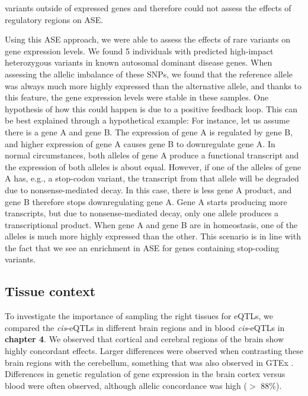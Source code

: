 variants outside of expressed genes and therefore could not assess the effects of regulatory regions on ASE.


Using this ASE approach, we were able to assess the effects of rare variants on gene expression levels. We found 5 individuals with predicted high-impact heterozygous variants in known autosomal dominant disease genes. When assessing the allelic imbalance of these SNPs, we found that the reference allele was always much more highly expressed than the alternative allele, and thanks to this feature, the gene expression levels were stable in these samples. One hypothesis of how this could happen is due to a positive feedback loop. This can be best explained through a hypothetical example: For instance, let us assume there is a gene A and gene B. The expression of gene A is regulated by gene B, and higher expression of gene A causes gene B to downregulate gene A. In normal circumstances, both alleles of gene A produce a functional transcript and the expression of both alleles is about equal. However, if one of the alleles of gene A has, e.g., a stop-codon variant, the transcript from that allele will be degraded due to nonsense-mediated decay. In this case, there is less gene A product, and gene B therefore stops downregulating gene A. Gene A starts producing more transcripts, but due to nonsense-mediated decay, only one allele produces a transcriptional product. When gene A and gene B are in homeostasis, one of the alleles is much more highly expressed than the other. This scenario is in line with the fact that we see an enrichment in ASE for genes containing stop-coding variants.


\subsection{Tissue context}
To investigate the importance of sampling the right tissues for eQTLs, we compared the \emph{cis}-eQTLs in different brain regions and in blood \emph{cis}-eQTLs in \textbf{chapter 4}. We observed that cortical and cerebral regions of the brain show highly concordant effects. Larger differences were observed when contrasting these brain regions with the cerebellum, something that was also observed in GTEx \cite{GTExConsortiumAtlas}. Differences in genetic regulation of gene expression in the brain cortex versus blood were often observed, although allelic concordance was high ($>$ 88\%). 

